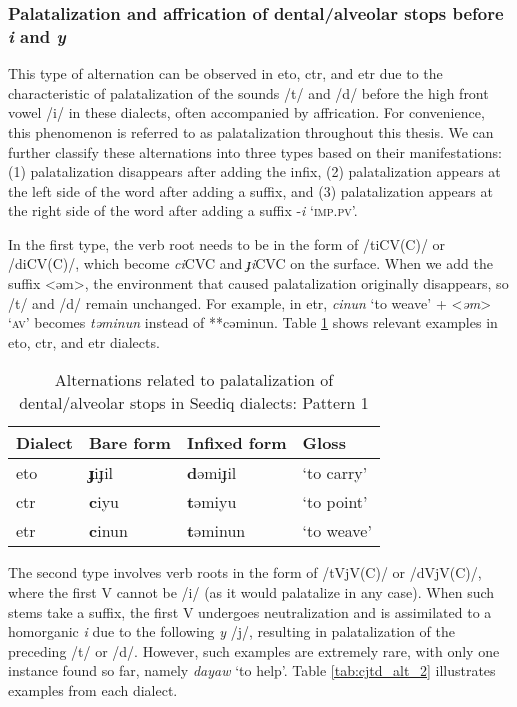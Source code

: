 \subsubsection{Palatalization and affrication of dental/alveolar stops before \textit{i} and \textit{y}}

This type of alternation can be observed in \acl{eto}, \acl{ctr}, and \acl{etr} due to the characteristic of palatalization of the sounds /t/ and /d/ before the high front vowel /i/ in these dialects, often accompanied by affrication. For convenience, this phenomenon is referred to as palatalization throughout this thesis. We can further classify these alternations into three types based on their manifestations: (1) palatalization disappears after adding the infix, (2) palatalization appears at the left side of the word after adding a suffix, and (3) palatalization appears at the right side of the word after adding a suffix -\textit{i} `\textsc{imp.pv}'.

In the first type, the verb root needs to be in the form of /tiCV(C)/ or /diCV(C)/, which become \textit{ci}CVC and \textit{ɟi}CVC on the surface. When we add the suffix <əm>, the environment that caused palatalization originally disappears, so /t/ and /d/ remain unchanged. For example, in \acl{etr}, \textit{cinun} `to weave' + <\textit{əm}> `\textsc{av}' becomes \textit{təminun} instead of **cəminun. Table \ref{tab:cjtd_alt_1} shows relevant examples in \acl{eto}, \acl{ctr}, and \acl{etr} dialects. 

\begin{table}[!htbp]
\centering
\caption{Alternations related to palatalization of dental/alveolar stops in Seediq dialects: Pattern 1}
\label{tab:cjtd_alt_1}
\begin{tabular}{llll}
\hline
Dialect   & Bare form & Infixed form & Gloss      \\ \hline
\acl{eto} & \textbf{ɟ}iɟil     & \textbf{d}əmiɟil      & `to carry' \\
\acl{ctr} & \textbf{c}iyu      & \textbf{t}əmiyu       & `to point' \\
\acl{etr} & \textbf{c}inun     & \textbf{t}əminun      & `to weave' \\ \hline
\end{tabular}
\end{table}

The second type involves verb roots in the form of /tVjV(C)/ or /dVjV(C)/, where the first V cannot be /i/ (as it would palatalize in any case). When such stems take a suffix, the first V undergoes neutralization and is assimilated to a homorganic \textit{i} due to the following \textit{y} /j/, resulting in palatalization of the preceding /t/ or /d/. However, such examples are extremely rare, with only one instance found so far, namely \textit{dayaw} `to help'. Table \ref{tab:cjtd_alt_2} illustrates examples from each dialect.


